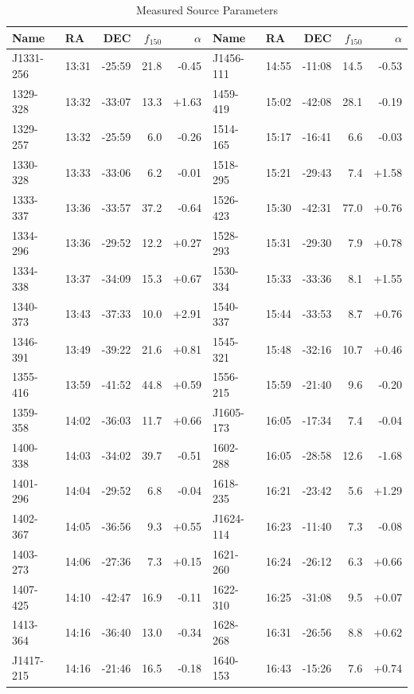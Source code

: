 \documentclass[preprint]{aastex}
\begin{document}
\begin{table}[ht]
\caption{Measured Source Parameters}
\begin{tabular}{l|lrrr||l|lrrr}
\hline
Name & RA & DEC & $f_{150}$ & $\alpha$ & Name & RA & DEC & $f_{150}$ & $\alpha$
\\
\hline
 J1331-256 & 13:31 & -25:59 &   21.8 & -0.45 &  J1456-111 & 14:55 & -11:08 &   14.5 & -0.53 \\
  1329-328 & 13:32 & -33:07 &   13.3 & +1.63 &   1459-419 & 15:02 & -42:08 &   28.1 & -0.19 \\
  1329-257 & 13:32 & -25:59 &    6.0 & -0.26 &   1514-165 & 15:17 & -16:41 &    6.6 & -0.03 \\
  1330-328 & 13:33 & -33:06 &    6.2 & -0.01 &   1518-295 & 15:21 & -29:43 &    7.4 & +1.58 \\
  1333-337 & 13:36 & -33:57 &   37.2 & -0.64 &   1526-423 & 15:30 & -42:31 &   77.0 & +0.76 \\
  1334-296 & 13:36 & -29:52 &   12.2 & +0.27 &   1528-293 & 15:31 & -29:30 &    7.9 & +0.78 \\
  1334-338 & 13:37 & -34:09 &   15.3 & +0.67 &   1530-334 & 15:33 & -33:36 &    8.1 & +1.55 \\
  1340-373 & 13:43 & -37:33 &   10.0 & +2.91 &   1540-337 & 15:44 & -33:53 &    8.7 & +0.76 \\
  1346-391 & 13:49 & -39:22 &   21.6 & +0.81 &   1545-321 & 15:48 & -32:16 &   10.7 & +0.46 \\
  1355-416 & 13:59 & -41:52 &   44.8 & +0.59 &   1556-215 & 15:59 & -21:40 &    9.6 & -0.20 \\
  1359-358 & 14:02 & -36:03 &   11.7 & +0.66 &  J1605-173 & 16:05 & -17:34 &    7.4 & -0.04 \\
  1400-338 & 14:03 & -34:02 &   39.7 & -0.51 &   1602-288 & 16:05 & -28:58 &   12.6 & -1.68 \\
  1401-296 & 14:04 & -29:52 &    6.8 & -0.04 &   1618-235 & 16:21 & -23:42 &    5.6 & +1.29 \\
  1402-367 & 14:05 & -36:56 &    9.3 & +0.55 &  J1624-114 & 16:23 & -11:40 &    7.3 & -0.08 \\
  1403-273 & 14:06 & -27:36 &    7.3 & +0.15 &   1621-260 & 16:24 & -26:12 &    6.3 & +0.66 \\
  1407-425 & 14:10 & -42:47 &   16.9 & -0.11 &   1622-310 & 16:25 & -31:08 &    9.5 & +0.07 \\
  1413-364 & 14:16 & -36:40 &   13.0 & -0.34 &   1628-268 & 16:31 & -26:56 &    8.8 & +0.62 \\
 J1417-215 & 14:16 & -21:46 &   16.5 & -0.18 &   1640-153 & 16:43 & -15:26 &    7.6 & +0.74 \\

\end{tabular}
\end{table}
\end{document}
